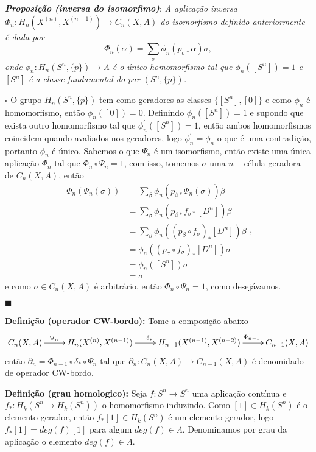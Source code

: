 \documentclass[12pt]{book}
\newcommand{\homologia}[2]{H_{#1}(#2)}
\newcommand{\homologiarel}[3]{H_{#1}(#2,#3)}
\newcommand{\homologiarelskele}[3]{H_{#1}(X^{(#2)}, X^{(#3)})}
\newcommand{\homologiarelskelesimpl}[2]{H_{#1}(X^{(#2)}, X^{(#2-1)})}
\newcommand{\definicaonomeada}[2]{\vspace{2mm} \textbf{Definição (#1):}{ #2}}
\newcommand{\tese}[3]{\vspace{2mm} \textit{\textbf{#1}}: \textit{#2} \par $\square$ #3 \par $\blacksquare$}
\begin{document}
	\tese{Proposição (inversa do isomorfimo)}{A aplicação inversa $\Phi_{n} : \homologiarelskelesimpl{n}{n} \to C_{n}(X,A)$ do isomorfismo definido anteriormente é dada por
	$$
	\Phi_{n}(\alpha) = \sum_{\sigma} \phi_{n}(p_{\sigma *}\alpha)\sigma,
	$$
	onde $\phi_{n}: \homologiarel{n}{S^{n}}{\{p\}} \to \Lambda$ é o único homomorfismo tal que $\phi_{n}([S^{n}])=1$ e $[S^{n}]$ é a classe fundamental do par $(S^{n}, \{p\})$.}{O grupo $\homologiarel{n}{S^{n}}{\{p\}}$ tem como geradores as classes $\{[S^{n}], [0]\}$ e como $\phi_{n}$ é homomorfismo, então $\phi_{n}([0]) = 0$. Definindo $\phi_{n}([S^{n}]) = 1$ e supondo que exista outro homomorfismo tal que $\phi_{n}^{'} ([S^{n}]) = 1$, então ambos homomorfismos coincidem quando avaliados nos geradores, logo $\phi_{n}^{'}=\phi_{n}$ o que é uma contradição, portanto $\phi_{n}$ é único. Sabemos o que $\Psi_{n}$ é um isomorfismo, então existe uma única aplicação $\Phi_{n}$ tal que $\Phi_{n} \circ \Psi_{n} = 1$, com isso, tomemos $\sigma$ uma $n-$célula geradora de $C_{n}(X,A)$, então
	$$
	\begin{aligned}
	\Phi_{n}(\Psi_{n}(\sigma)) 
	&= \sum_{\beta}\phi_{n}(p_{\beta *}\Psi_{n}(\sigma))\beta
	\\
	&= \sum_{\beta}\phi_{n}(p_{\beta *}f_{\sigma *}[D^{n}])\beta
	\\
	&= \sum_{\beta}\phi_{n}((p_{\beta}\circ f_{\sigma})_{*}[D^{n}])\beta
	\\
	&= \phi_{n}((p_{\sigma}\circ f_{\sigma})_{*}[D^{n}])\sigma
	\\
	&= \phi_{n}([S^{n}])\sigma
	\\
	&= \sigma	
	\end{aligned},
	$$
	e como $\sigma \in C_{n}(X,A)$ é arbitrário, então $\Phi_{n} \circ \Psi_{n} = 1$, como desejávamos.
	}
	
	\definicaonomeada{operador CW-bordo}{Tome a composição abaixo
	\[
	\xymatrix{
		C_{n}(X,A) \ar[r]^{\Psi_{n}\qquad} &
		\homologiarelskelesimpl{n}{n} \ar[r]^{\delta_{*}} & 
		\homologiarelskele{n-1}{n-1}{n-2} \ar[r]^{\qquad \Phi_{n-1}}&
		C_{n-1}(X,A)
		}
	\]
	então $\partial_{n} = \Phi_{n-1} \circ \delta_{*} \circ \Psi_{n}$ tal que $\partial_{n}: C_{n}(X,A) \to C_{n-1}(X,A)$ é denomidado de operador CW-bordo.}

	\definicaonomeada{grau homologico}{Seja $f: S^{n} \to S^{n}$ uma aplicação contínua e $f_{*}: \homologia{k}{S^{n} \to \homologia{k}{S^{n}}}$ o homomorfismo induzindo. Como $[1] \in \homologia{k}{S^{n}}$ é o elemento gerador, então $f_{*}[1] \in \homologia{k}{S^{n}}$ é um elemento gerador, logo $f_{*}[1] = deg(f)[1]$ para algum $deg(f) \in \Lambda$. Denominamos por grau da aplicação o elemento $deg(f) \in \Lambda$.}
\end{document}
